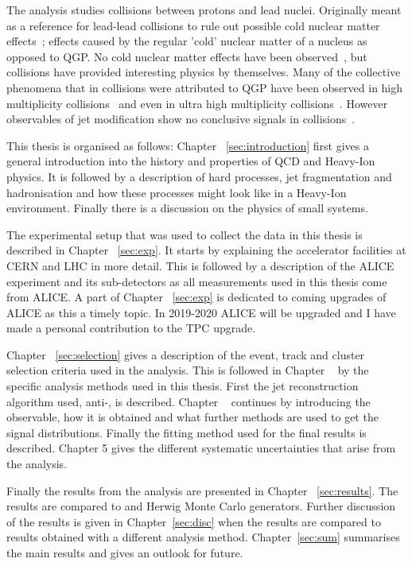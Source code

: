 The analysis studies collisions between protons and lead nuclei. Originally meant as a reference for lead-lead collisions to rule out possible cold nuclear matter effects~\cite{Connors:2017ptx}; effects caused by the regular 'cold' nuclear matter of a nucleus as opposed to QGP. No cold nuclear matter effects have been observed~\cite{Connors:2017ptx}, but \pPb collisions have provided interesting physics by themselves. Many of the collective phenomena that in \PbPb collisions were attributed to QGP have been observed in high multiplicity \pPb collisions~\cite{Nagle:2018nvi} and even in ultra high multiplicity \pp collisions~\cite{Nagle:2018nvi}. However observables of jet modification show no conclusive signals in \pPb collisions~\cite{Connors:2017ptx,Nagle:2018nvi}.

This thesis is organised as follows: Chapter ~\ref{sec:introduction} first gives a general introduction into the history and properties of QCD and Heavy-Ion physics. It is followed by a description of hard processes, jet fragmentation and hadronisation and how these processes might look like in a Heavy-Ion environment. Finally there is a discussion on the physics of small systems.

The experimental setup that was used to collect the data in this thesis is described in Chapter ~\ref{sec:exp}. It starts by explaining the accelerator facilities at CERN and LHC in more detail. This is followed by a description of the ALICE experiment and its sub-detectors as all measurements used in this thesis come from ALICE. A part of Chapter ~\ref{sec:exp} is dedicated to coming upgrades of ALICE as this a timely topic. In 2019-2020 ALICE will be upgraded and I have made a personal contribution to the TPC upgrade.

Chapter ~\ref{sec:selection} gives a description of the event, track and cluster selection criteria used in the analysis. This is followed in Chapter ~\cite{sec:methods} by the specific analysis methods used in this thesis. First the jet reconstruction algorithm used, anti-\kt{}, is described. Chapter ~\cite{sec:methods} continues by introducing the \jt{} observable, how it is obtained and what further methods are used to get the signal distributions. Finally the fitting method used for the final results is described. Chapter 5 gives the different systematic uncertainties that arise from the analysis.

Finally the results from the analysis are presented in Chapter ~\ref{sec:results}. The results are compared to \pythia and Herwig Monte Carlo generators. Further discussion of the results is given in Chapter~\ref{sec:disc} when the results are compared to \jt{} results obtained with a different analysis method. Chapter~\ref{sec:sum} summarises the main results and gives an outlook for future.


